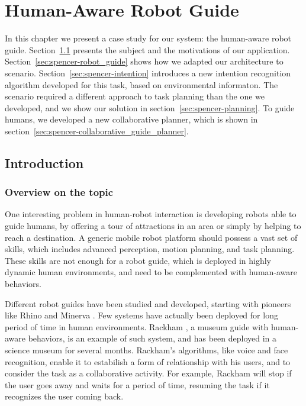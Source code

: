 
\chapter{Human-Aware Robot Guide} %

\label{chapter:spencer} %


 In this chapter we present a case study for our system: the human-aware robot guide. Section~\ref{sec:spencer-intro} presents the subject and the motivations of our application. Section~\ref{sec:spencer-robot_guide} shows how we adapted our architecture to scenario. Section~\ref{sec:spencer-intention} introduces a new intention recognition algorithm developed for this task, based on environmental informaton. The scenario required a different approach to task planning than the one we developed, and we show our solution in section~\ref{sec:spencer-planning}. To guide humans, we developed a new collaborative planner, which is shown in section~\ref{sec:spencer-collaborative_guide_planner}. 

\section{Introduction}
\label{sec:spencer-intro}
\subsection{Overview on the topic}
One interesting problem in human-robot interaction is developing robots able to guide humans, by offering a tour of attractions in an area or simply by helping to reach a destination.
A generic mobile robot platform should possess a vast set of skills, which includes advanced perception, motion planning, and task planning. These skills are not enough for a robot guide, which is deployed in highly dynamic human environments, and need to be complemented with human-aware behaviors.

Different robot guides have been studied and developed, starting with pioneers like Rhino and Minerva \citep{thrun2000probabilistic}.  Few systems have actually been deployed for long period of time in human environments. Rackham \citep{clodic2006rackham}, a museum guide with human-aware behaviors, is an example of such system, and has been deployed in a science museum for several months.  Rackham's algorithms, like voice and face recognition, enable it to estabilish a form of relationship with his users, and to consider the task as a collaborative activity. For example, Rackham will stop if the user goes away and waits for a period of time, resuming the task if it recognizes the user coming back.

